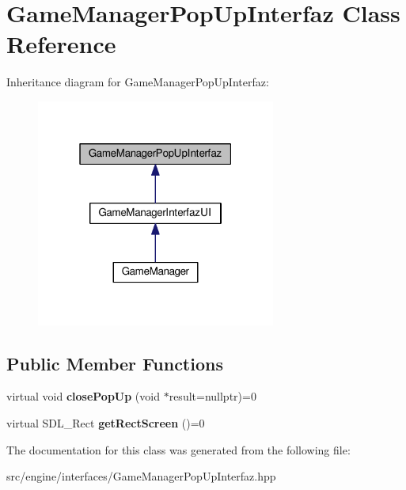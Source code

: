 \hypertarget{class_game_manager_pop_up_interfaz}{}\section{Game\+Manager\+Pop\+Up\+Interfaz Class Reference}
\label{class_game_manager_pop_up_interfaz}


Inheritance diagram for Game\+Manager\+Pop\+Up\+Interfaz\+:\nopagebreak
\begin{figure}[H]
\begin{center}
\leavevmode
\includegraphics[width=223pt]{class_game_manager_pop_up_interfaz__inherit__graph}
\end{center}
\end{figure}
\subsection*{Public Member Functions}
\begin{DoxyCompactItemize}
\item 
virtual void {\bfseries close\+Pop\+Up} (void $\ast$result=nullptr)=0\hypertarget{class_game_manager_pop_up_interfaz_a2eae4cfc151ef0fbf0a799fd0902fe95}{}\label{class_game_manager_pop_up_interfaz_a2eae4cfc151ef0fbf0a799fd0902fe95}

\item 
virtual S\+D\+L\+\_\+\+Rect {\bfseries get\+Rect\+Screen} ()=0\hypertarget{class_game_manager_pop_up_interfaz_a02a36f94f6986f434d33bae658581b32}{}\label{class_game_manager_pop_up_interfaz_a02a36f94f6986f434d33bae658581b32}

\end{DoxyCompactItemize}


The documentation for this class was generated from the following file\+:\begin{DoxyCompactItemize}
\item 
src/engine/interfaces/Game\+Manager\+Pop\+Up\+Interfaz.\+hpp\end{DoxyCompactItemize}
